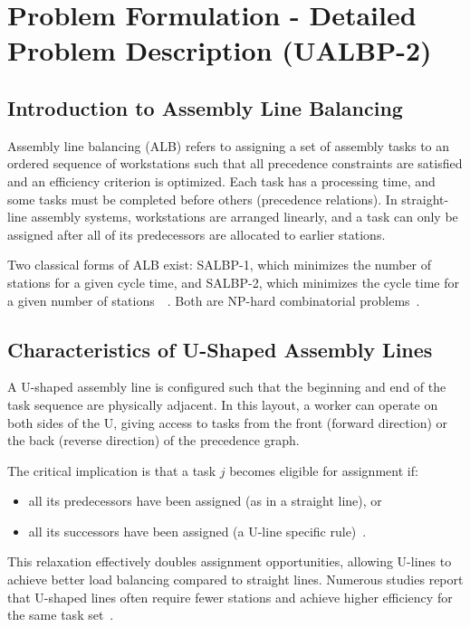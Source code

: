 \documentclass[12pt,a4paper]{article}
\begin{document}

\newpage
\section{Problem Formulation - Detailed Problem Description (UALBP-2)}

\par
\subsection{Introduction to Assembly Line Balancing}
Assembly line balancing (ALB) refers to assigning a set of assembly tasks to an ordered
sequence of workstations such that all precedence constraints are satisfied and an efficiency
criterion is optimized. Each task has a processing time, and some tasks must be completed
before others (precedence relations). In straight-line assembly systems, workstations are
arranged linearly, and a task can only be assigned after all of its predecessors are allocated
to earlier stations.

Two classical forms of ALB exist: SALBP-1, which minimizes the number of stations
for a given cycle time, and SALBP-2, which minimizes the cycle time for a given number of
stations~~\cite{scholl_becker_2006,talbot_patterson_gehrlein_1986}. Both are NP-hard combinatorial problems~\cite{garey_johnson_1979}.

\par
\subsection{Characteristics of U-Shaped Assembly Lines}
A U-shaped assembly line is configured such that the beginning and end of the task sequence
are physically adjacent. In this layout, a worker can operate on both sides of the U, giving
access to tasks from the front (forward direction) or the back (reverse direction) of the
precedence graph.

The critical implication is that a task $j$ becomes eligible for assignment if:
\begin{itemize}
\item all its predecessors have been assigned (as in a straight line), or
\item all its successors have been assigned (a U-line specific rule)~\cite{miltenburg_2001,urban_1998}.
\end{itemize}
This relaxation effectively doubles assignment opportunities, allowing U-lines to achieve
better load balancing compared to straight lines. Numerous studies report that U-shaped
lines often require fewer stations and achieve higher efficiency for the same task set~\cite{miltenburg_2001}.
\end{document}
